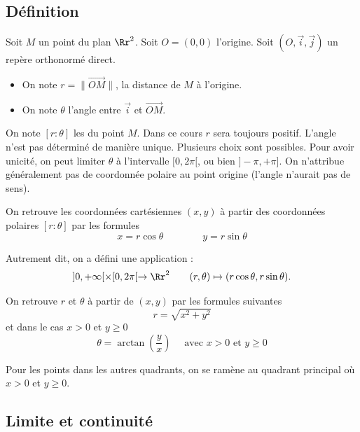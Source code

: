 \documentclass[12pt, class=report,crop=false]{standalone}
\begin{document}
\subsection{Définition}

Soit $M$ un point du plan $\Rr^2$. Soit $O=(0,0)$ l'origine. Soit $(O, \vec i, \vec j)$ un repère orthonormé direct.

\begin{itemize}
  \item On note $r = \| \overrightarrow{OM} \|$, la distance de $M$ à l'origine.
  \item On note $\theta$ l'angle entre $\vec i$ et $\vec{OM}$.
\end{itemize}


On note $[r:\theta]$ les  du point $M$. Dans ce cours $r$ sera toujours positif.
L'angle n'est pas déterminé de manière unique. Plusieurs choix sont possibles. 
Pour avoir unicité, on peut limiter $\theta$ à l'intervalle $[0,2\pi[$, ou bien 
$]-\pi,+\pi]$. On n'attribue généralement pas de coordonnée polaire au point origine (l'angle n'aurait pas de sens). 

\bigskip
{}

On retrouve les coordonnées cartésiennes $(x,y)$ à partir des coordonnées polaires $[r:\theta]$ par les formules
$$x = r\cos \theta \qquad \qquad y = r \sin \theta$$

Autrement dit, on a défini une application :
$$
]0,+\infty[\times[0,2\pi[\rightarrow \Rr^2 \qquad (r,\theta)\mapsto (r\cos\theta,r\sin\theta).
$$

\bigskip
{}

On retrouve  $r$ et $\theta$ à partir de $(x,y)$ par les formules suivantes
$$r = \sqrt{x^2+y^2}$$
et dans le cas $x>0$ et $y\ge0$
$$\theta = \arctan\left(\frac yx\right)   \quad \text{ avec } x>0 \text{ et } y \ge 0$$

Pour les points dans les autres quadrants, on se ramène au quadrant principal où $x>0$ et $y\ge0$.



\subsection{Limite et continuité}
\end{document}
